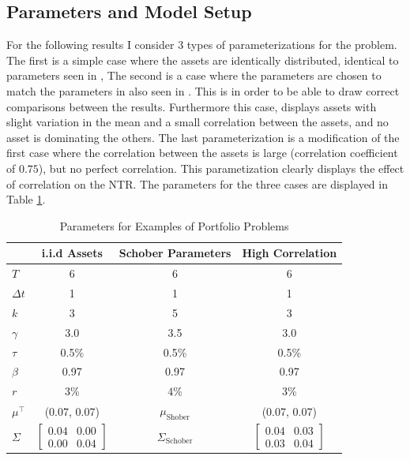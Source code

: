 \documentclass[11pt]{article}
\begin{document}
\subsection{Parameters and Model Setup} \label{Subsection: Parameters}
For the following results I consider 3 types of parameterizations for the problem.
The first is a simple case where the assets are identically distributed, identical to parameters seen in \autocite{CaiJuddXu2013},
The second is a case where the parameters are chosen to match the parameters in \autocite{Schober2022} also seen in \autocite{Scheidegger2023}.
This is in order to be able to draw correct comparisons between the results. Furthermore this case,
displays assets with slight variation in the mean and a small correlation between the assets, and no asset is dominating the others.
The last parameterization is a modification of the first case where the correlation between the assets is large (correlation coefficient of $0.75$), but no perfect correlation.
This parametization clearly displays the effect of correlation on the \ac{NTR}. The parameters for the three cases are displayed in Table \ref{table: Parameters_Models}.
\begin{table}[!ht]
    \label{table: Parameters_Base_Models}
    \centering
    \caption{Parameters for Examples of Portfolio Problems} \label{table: Parameters_Models}
    \begin{tabular}{lccc}
    \toprule
    & \textbf{i.i.d Assets} & \textbf{Schober Parameters} & \textbf{High Correlation} \\
    \midrule
    $T$        & 6                & 6                & 6                \\
    $\Delta t$ & 1                & 1                & 1                \\
    $k$        & 3                & 5                & 3                \\
    $\gamma$   & 3.0              & 3.5              & 3.0              \\
    $\tau$     & 0.5\%            & 0.5\%            & 0.5\%            \\
    $\beta$    & 0.97             & 0.97             & 0.97             \\
    $r$        & $3$\% & $4$\%    &  $3$\% \\
    $\mu^\top$ & (0.07, 0.07) & $\mu_{\text{Shober}}$ & (0.07, 0.07) \\
    $\Sigma$   & 
    $\begin{bmatrix}
    0.04 & 0.00 \\
    0.00 & 0.04
    \end{bmatrix}$
    & $\Sigma_{\text{Schober}}$ 
    & 
    $\begin{bmatrix}
    0.04 & 0.03\\
    0.03 & 0.04
    \end{bmatrix}$ \\
    \bottomrule
    \end{tabular}
\end{table}
\end{document}
